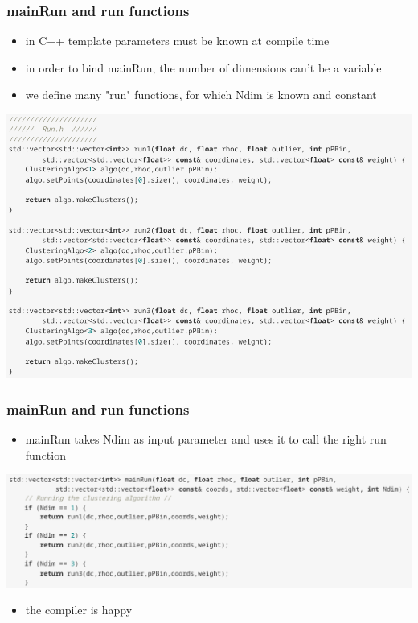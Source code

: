 \documentclass{beamer}
\begin{document}
\begin{frame}
\frametitle{mainRun and run functions}
\begin{itemize}
	\item in C++ template parameters must be known at compile time
	\item in order to bind mainRun, the number of dimensions can't be a variable
	\item we define many "run" functions, for which Ndim is known and constant
\end{itemize}
\begin{center}
	\includegraphics[scale=0.3]{run.png}
\end{center}
\end{frame}
\begin{frame}
\frametitle{mainRun and run functions}
\begin{itemize}
	\item mainRun takes Ndim as input parameter and uses it to call the right run function
\end{itemize}
\begin{center}
	\includegraphics[scale=0.3]{mainRun.png}
\end{center}
\begin{itemize}
	\item the compiler is happy
\end{itemize}
\end{frame}
\end{document}
